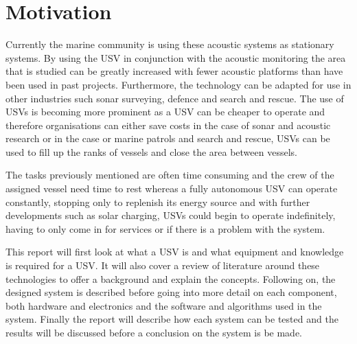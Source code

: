 \section{Motivation}
Currently the marine community is using these acoustic systems as stationary systems. By using the USV in conjunction with the acoustic monitoring the area that is studied can be greatly increased with fewer acoustic platforms than have been used in past projects. Furthermore, the technology can be adapted for use in other industries such sonar surveying, defence and search and rescue. The use of USVs is becoming more prominent as a USV can be cheaper to operate and therefore organisations can either save costs in the case of sonar and acoustic research or in the case or marine patrols and search and rescue, USVs can be used to fill up the ranks of vessels and close the area between vessels.\par
\vspace{0.6cm}
The tasks previously mentioned are often time consuming and the crew of the assigned vessel need time to rest whereas a fully autonomous USV can operate constantly, stopping only to replenish its energy source and with further developments such as solar charging, USVs could begin to operate indefinitely, having to only come in for services or if there is a problem with the system.\par
\vspace{0.6cm}
This report will first look at what a USV is and what equipment and knowledge is required for a USV. It will also cover a review of literature around these technologies to offer a background and explain the concepts. Following on, the designed system is described before going into more detail on each component, both hardware and electronics and the software and algorithms used in the system. Finally the report will describe how each system can be tested and the results will be discussed before a conclusion on the system is be made.
